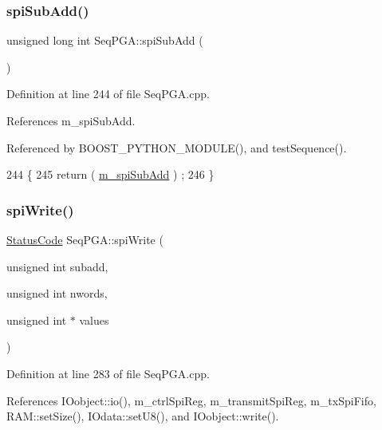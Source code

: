\subsubsection{\texorpdfstring{spi\+Sub\+Add()}{spiSubAdd()}}
{\footnotesize\ttfamily unsigned long int Seq\+P\+G\+A\+::spi\+Sub\+Add (\begin{DoxyParamCaption}{ }\end{DoxyParamCaption})}



Definition at line 244 of file Seq\+P\+G\+A.\+cpp.



References m\+\_\+spi\+Sub\+Add.



Referenced by B\+O\+O\+S\+T\+\_\+\+P\+Y\+T\+H\+O\+N\+\_\+\+M\+O\+D\+U\+L\+E(), and test\+Sequence().


\begin{DoxyCode}
244                                    \{
245   \textcolor{keywordflow}{return} ( \hyperlink{classSeqPGA_afd5442d9b92f9b59bd553df9bd91dd87}{m\_spiSubAdd} ) ;
246 \}
\end{DoxyCode}
\mbox{\label{classSeqPGA_ad4421841ce4ce8b88ad13f63216f0743}} 
\subsubsection{\texorpdfstring{spi\+Write()}{spiWrite()}\hspace{0.1cm}{\footnotesize\ttfamily [1/3]}}
{\footnotesize\ttfamily \hyperlink{classStatusCode}{Status\+Code} Seq\+P\+G\+A\+::spi\+Write (\begin{DoxyParamCaption}\item[{unsigned int}]{subadd,  }\item[{unsigned int}]{nwords,  }\item[{unsigned int $\ast$}]{values }\end{DoxyParamCaption})}



Definition at line 283 of file Seq\+P\+G\+A.\+cpp.



References I\+Oobject\+::io(), m\+\_\+ctrl\+Spi\+Reg, m\+\_\+transmit\+Spi\+Reg, m\+\_\+tx\+Spi\+Fifo, R\+A\+M\+::set\+Size(), I\+Odata\+::set\+U8(), and I\+Oobject\+::write().



